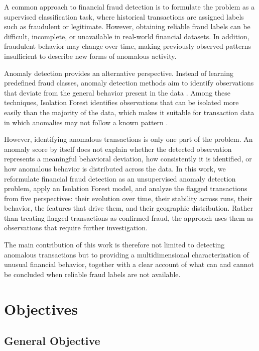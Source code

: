 \documentclass[journal]{IEEEtran}
\begin{document}
A common approach to financial fraud detection is to formulate the problem as a supervised classification task, where historical transactions are assigned labels such as fraudulent or legitimate. However, obtaining reliable fraud labels can be difficult, incomplete, or unavailable in real-world financial datasets. In addition, fraudulent behavior may change over time, making previously observed patterns insufficient to describe new forms of anomalous activity.

Anomaly detection provides an alternative perspective. Instead of learning predefined fraud classes, anomaly detection methods aim to identify observations that deviate from the general behavior present in the data \cite{chandola2009anomaly}. Among these techniques, Isolation Forest identifies observations that can be isolated more easily than the majority of the data, which makes it suitable for transaction data in which anomalies may not follow a known pattern \cite{liu2008isolation}.

However, identifying anomalous transactions is only one part of the problem. An anomaly score by itself does not explain whether the detected observation represents a meaningful behavioral deviation, how consistently it is identified, or how anomalous behavior is distributed across the data. In this work, we reformulate financial fraud detection as an unsupervised anomaly detection problem, apply an Isolation Forest model, and analyze the flagged transactions from five perspectives: their evolution over time, their stability across runs, their behavior, the features that drive them, and their geographic distribution. Rather than treating flagged transactions as confirmed fraud, the approach uses them as observations that require further investigation.

The main contribution of this work is therefore not limited to detecting anomalous transactions but to providing a multidimensional characterization of unusual financial behavior, together with a clear account of what can and cannot be concluded when reliable fraud labels are not available.


\section{Objectives}

\subsection{General Objective}
\end{document}
